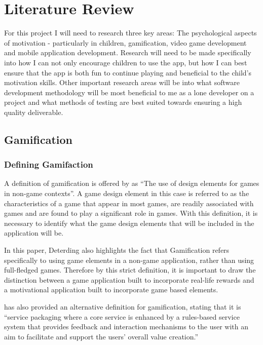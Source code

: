 
\chapter{Literature Review}
\label{chap:litReview}

For this project I will need to research three key areas: The psychological aspects of motivation - particularly in children, gamification, video game development and mobile application development.
Research will need to be made specifically into how I can not only encourage children to use the app, but how I can best ensure that the app is both fun to continue playing and beneficial to the child's motivation skills.
Other important research areas will be into what software development methodology will be most beneficial to me as a lone developer on a project and what methods of testing are best suited towards ensuring a high quality deliverable.

\section{Gamification}
\subsection{Defining Gamifaction}
A definition of gamification is offered by \cite{Deterding:2011:GDE:2181037.2181040} as ``The use of design elements for games in non-game contexts''. 
A game design element in this case is referred to as the characteristics of a game that appear in most games, are readily associated with games and are found to play a significant role in games.
With this definition, it is necessary to identify what the game design elements that will be included in the application will be. 

In this paper, Deterding also highlights the fact that Gamification refers specifically to using game elements in a non-game application, rather than using full-fledged games.
Therefore by this strict definition, it is important to draw the distinction between a game application built to incorporate real-life rewards and a motivational application built to incorporate game based elements.

\cite{huotari2011gamification} has also provided an alternative definition for gamification, stating that it is ``service packaging where a core service is enhanced by a rules-based service system that provides feedback and interaction mechanisms to the user with an aim to facilitate and support the users’ overall value creation.''

